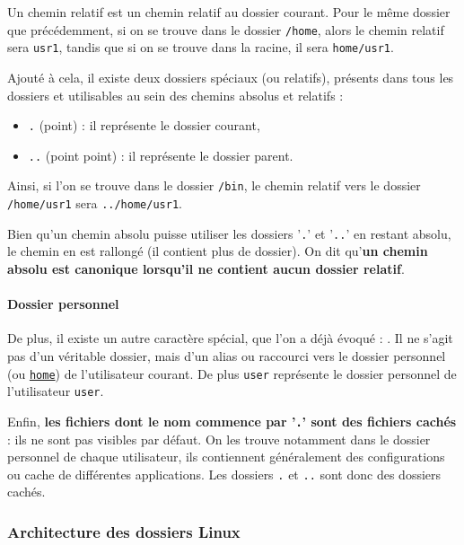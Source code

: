 Un chemin relatif est un chemin relatif au dossier courant. Pour le même dossier que précédemment, si on se trouve dans le dossier \texttt{/home}, alors le chemin relatif sera \texttt{usr1}, tandis que si on se trouve dans la racine, il sera \texttt{home/usr1}.

Ajouté à cela, il existe deux dossiers spéciaux (ou relatifs), présents dans tous les dossiers et utilisables au sein des chemins absolus et relatifs : 
\begin{itemize}
    \item \texttt{.} (point) : il représente le dossier courant,
    \item \texttt{..} (point point) : il représente le dossier parent.
\end{itemize}

Ainsi, si l'on se trouve dans le dossier \texttt{/bin}, le chemin relatif vers le dossier \texttt{/home/usr1} sera \texttt{../home/usr1}.

 Bien qu'un chemin absolu puisse utiliser les dossiers '\texttt{.}' et '\texttt{..}' en restant absolu, le chemin en est rallongé (il contient plus de dossier). On dit qu'\textbf{un chemin absolu est canonique lorsqu'il ne contient aucun dossier relatif}.

\paragraph{Dossier personnel}

De plus, il existe un autre caractère spécial, que l'on a déjà évoqué : \texttt{\tilde}. Il ne s'agit pas d'un véritable dossier, mais d'un alias ou raccourci vers le dossier personnel (ou \hyperref[sec:dirhome]{\texttt{home}}) de l'utilisateur courant. De plus \texttt{\tilde user} représente le dossier personnel de l'utilisateur \texttt{user}.

Enfin, \textbf{les fichiers dont le nom commence par '\texttt{.}' sont des fichiers cachés} : ils ne sont pas visibles par défaut. On les trouve notamment dans le dossier personnel de chaque utilisateur, ils contiennent généralement des configurations ou cache de différentes applications. Les dossiers \texttt{.} et \texttt{..} sont donc des dossiers cachés.

\newpage
\subsubsection{Architecture des dossiers Linux}

